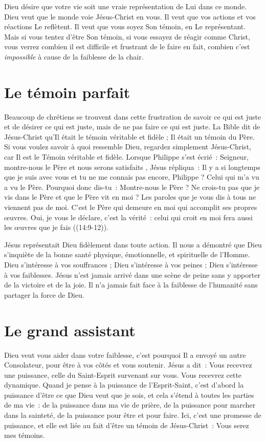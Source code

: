 Dieu désire que votre vie soit une vraie représentation de Lui dans ce monde.
 Dieu veut que le monde voie Jésus-Christ en vous.
 Il veut que vos actions et vos réactions Le reflètent.
 Il veut que vous soyez Son témoin, en Le représentant.
 Mais si vous tentez d'être Son témoin, si vous essayez de réagir comme Christ,
 vous verrez combien il est difficile et frustrant de le faire
 \ocadr en fait, combien c'est \emph{impossible}
 à cause de la faiblesse de la chair.

\section*{Le témoin parfait}

Beaucoup de chrétiens se trouvent dans cette frustration de savoir
 ce qui est juste et de désirer ce qui est juste, mais de ne pas faire
 ce qui est juste.
 La Bible dit de Jésus-Christ qu'Il était le témoin véritable et fidèle ;
 Il était un témoin du Père.
 Si vous voulez savoir à quoi ressemble Dieu, regardez simplement
 Jésus-Christ, car Il est le Témoin véritable et fidèle.
 Lorsque Philippe s'est écrié~:
 \og Seigneur, montre-nous le Père et nous serons satisfaits \fg{},
 Jésus répliqua~:
 \og Il y a si longtemps que je suis avec vous et tu ne me connais pas encore,
 Philippe ? Celui qui m'a vu a vu le Père. Pourquoi donc dis-tu~:
 \og Montre-nous le Père \fg{} ?
 Ne crois-tu pas que je vis dans le Père et que le Père vit en moi ?
 Les paroles que je vous dis à tous ne viennent pas de moi.
 C'est le Père qui demeure en moi qui accomplit ses propres œuvres.
 Oui, je vous le déclare, c'est la vérité~:
 celui qui croit en moi fera aussi les œuvres que je fais \fg{}
 ((14:9-12)).

Jésus représentait Dieu fidèlement dans toute action.
 Il nous a démontré que Dieu s'inquiète de la bonne santé physique,
 émotionnelle, et spirituelle de l'Homme.
 Dieu s'intéresse à vos souffrances ; Dieu s'intéresse à vos peines ;
 Dieu s'intéresse à vos faiblesses.
 Jésus n'est jamais arrivé dans une scène de peine sans y apporter
 de la victoire et de la joie. Il n'a jamais fait face à la faiblesse
 de l'humanité sans partager la force de Dieu.

\section*{Le grand assistant}

Dieu veut vous aider dans votre faiblesse,
 c'est pourquoi Il a envoyé un autre Consolateur,
 pour être à vos côtés et vous soutenir. Jésus a dit~:
 \og Vous recevrez une puissance,
 celle du Saint-Esprit survenant sur vous. \fg{}
 Vous recevrez cette dynamique. Quand je pense à la puissance
 de l'Esprit-Saint, c'est d'abord la puissance d'être ce que Dieu
 veut que je sois, et cela s'étend à toutes les parties de ma vie~:
 de la puissance dans ma vie de prière, de la puissance pour marcher
 dans la sainteté, de la puissance pour être et pour faire.
 Ici, c'est une promesse de puissance, et elle est liée au fait
 d'être un témoin de Jésus-Christ~: \og Vous serez mes témoins. \fg{}

